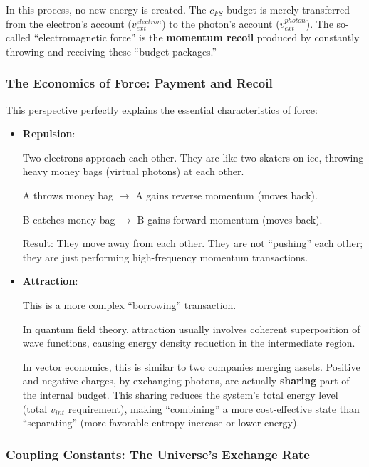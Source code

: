 In this process, no new energy is created. The $c_{FS}$ budget is merely transferred from the electron's account ($v_{ext}^{electron}$) to the photon's account ($v_{ext}^{photon}$). The so-called ``electromagnetic force'' is the \textbf{momentum recoil} produced by constantly throwing and receiving these ``budget packages.''

\subsubsection{The Economics of Force: Payment and Recoil}

This perspective perfectly explains the essential characteristics of force:

\begin{itemize}
\item \textbf{Repulsion}:

    Two electrons approach each other. They are like two skaters on ice, throwing heavy money bags (virtual photons) at each other.

    A throws money bag $\rightarrow$ A gains reverse momentum (moves back).

    B catches money bag $\rightarrow$ B gains forward momentum (moves back).

    Result: They move away from each other. They are not ``pushing'' each other; they are just performing high-frequency momentum transactions.

\item \textbf{Attraction}:

    This is a more complex ``borrowing'' transaction.

    In quantum field theory, attraction usually involves coherent superposition of wave functions, causing energy density reduction in the intermediate region.

    In vector economics, this is similar to two companies merging assets. Positive and negative charges, by exchanging photons, are actually \textbf{sharing} part of the internal budget. This sharing reduces the system's total energy level (total $v_{int}$ requirement), making ``combining'' a more cost-effective state than ``separating'' (more favorable entropy increase or lower energy).
\end{itemize}

\subsubsection{Coupling Constants: The Universe's Exchange Rate}


